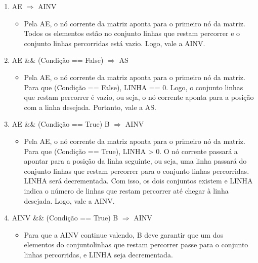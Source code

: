 \documentclass[a4paper,12pt,oneside]{book}
\begin{document}
\begin{enumerate}[label=\protect\circled{\arabic*}]
    \item AE $\Longrightarrow$ AINV

          \begin{itemize}
              \item Pela AE, o nó corrente da matriz aponta para o primeiro nó da matriz. Todos os elementos estão no conjunto linhas que restam percorrer e o conjunto linhas percorridas está vazio. Logo, vale a AINV.
          \end{itemize}

    \item AE \&\& (Condição == False) $\Longrightarrow$ AS

          \begin{itemize}
              \item Pela AE, o nó corrente da matriz aponta para o primeiro nó da matriz. Para que (Condição == False), LINHA == 0. Logo, o conjunto linhas que restam percorrer é vazio, ou seja, o nó corrente aponta para a posição com a linha desejada. Portanto, vale a AS.
          \end{itemize}

    \item AE \&\& (Condição == True) \circled{+} B $\Longrightarrow$ AINV

          \begin{itemize}
              \item Pela AE, o nó corrente da matriz aponta para o primeiro nó da matriz. Para que  (Condição == True), LINHA > 0. O nó corrente passará a apontar para a posição da linha seguinte, ou seja, uma linha passará do conjunto linhas que restam percorrer para o conjunto linhas percorridas. LINHA será decrementada. Com isso, os dois conjuntos existem e LINHA indica o número de linhas que restam percorrer até chegar à linha desejada. Logo, vale a AINV.
          \end{itemize}

    \item AINV \&\& (Condição == True) \circled{+} B $\Longrightarrow$ AINV

          \begin{itemize}
              \item Para que a AINV continue valendo, B deve garantir que um dos elementos do conjuntolinhas que restam percorrer passe para o conjunto linhas percorridas, e LINHA seja decrementada.
          \end{itemize}


\end{enumerate}
\end{document}
